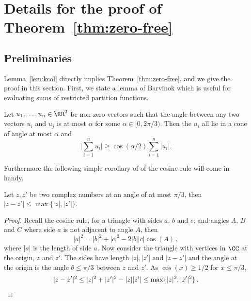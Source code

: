 \section{Details for the proof of Theorem~\ref{thm:zero-free}}\label{app:zero-free,details}
\subsection{Preliminaries}
%
Lemma~\ref{lem:kcol} directly implies Theorem~\ref{thm:zero-free}, and we give the proof in this section.
%
%
First, we state a lemma of Barvinok which is useful for evaluating sums of restricted partition functions.
\begin{lemma}
 \label{lem:cone}
 Let $u_1, \ldots, u_n \in \RR^2$ be non-zero vectors such that the angle between any two vectors $u_i$ and $u_j$ is at most $\alpha$ for some $\alpha \in [0,2\pi/3)$.
 Then the $u_i$ all lie in a cone of angle at most $\alpha$ and
 \[
 \bigg| \sum_{i=1}^n u_i \bigg| \geq \cos(\alpha/2) \sum_{i=1}^n |u_i|.
 \]
\end{lemma}
\noindent
Furthermore the following simple corollary of of the cosine rule will come in handy.
\begin{lemma}
\label{lem:smallanglediff}
 Let $z, z'$ be two complex numbers at an angle of at most $\pi/3$, then $|z-z'| \leq \max \{ |z|, |z'| \}$.
\end{lemma}
\begin{proof}
 Recall the cosine rule, for a triangle with sides $a$, $b$ and $c$; and angles $A$, $B$ and $C$ where side $a$ is not adjacent to angle $A$, then
 \[
 |a|^2 = |b|^2 + |c|^2 -2|b||c| \cos(A)\,,
 \]
 where $|a|$ is the length of side $a$.
 Now consider the triangle with vertices in $\CC$ at the origin, $z$ and $z'$.
 The sides have length $|z|, |z'|$ and $|z-z'|$ and the angle at the origin is the angle $\theta \leq \pi/3$ between $z$ and $z'$.
 As $\cos(x) \geq 1/2$ for $x \leq \pi/3$,
 \[
 |z-z'|^2 \leq |z|^2+|z'|^2-|z||z'| \leq \max\{|z|^2,|z'|^2\}\,.\qedhere
 \]
\end{proof}
 
